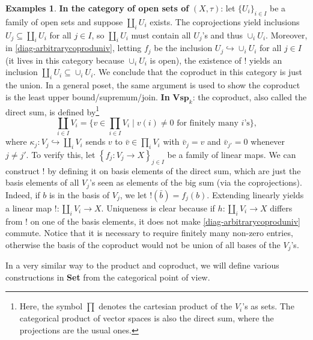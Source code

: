 \documentclass{article}
\theoremstyle{definition}
\newtheorem{exmps}[thm]{Examples}
\theoremstyle{remark}
\begin{document}
\begin{exmps}
    \textbf{In the category of open sets of} $(X, \tau)$: let $\{U_i\}_{i \in I}$ be a family of open sets and suppose $\coprod_i U_i$ exists. The coprojections yield inclusions $U_j \subseteq \coprod_i U_i$ for all $j \in I$, so $\coprod_i U_i$ must contain all $U_j$'s and thus $\cup_i U_i$. Moreover, in \eqref{diag-arbitrarycoproduniv}, letting $f_j$ be the inclusion $U_j \hookrightarrow \cup_iU_i$ for all $j\in I$  (it lives in this category because $\cup_i U_i$ is open), the existence of $!$ yields an inclusion $\coprod_i U_i \subseteq \cup_i U_i$. We conclude that the coproduct in this category is just the union. In a general poset, the same argument is used to show the coproduct is the least upper bound/supremum/join.
    \textbf{In} $\textbf{Vsp}_k$: the coproduct, also called the direct sum, is defined by\footnote{Here, the symbol $\prod$ denotes the cartesian product of the $V_i$'s as sets. The categorical product of vector spaces is also the direct sum, where the projections are the usual ones.} 
        \[\coprod_{i \in I} V_i = \{v \in \prod_{i\in I}V_i \mid v(i) \neq 0 \text{ for finitely many $i$'s}\},\]
        where $\kappa_j: V_j \hookrightarrow \coprod_i V_i$ sends $v$ to $\bar{v} \in \prod_i V_i$ with $\bar{v}_j = v$ and $\bar{v}_{j'} = 0$ whenever $j \neq j'$. To verify this, let $\left\{ f_j: V_j \rightarrow X\right\}_{j \in I}$ be a family of linear maps. We can construct $!$ by defining it on basis elements of the direct sum, which are just the basis elements of all $V_j$'s seen as elements of the big sum (via the coprojections). Indeed, if $b$ is in the basis of $V_j$, we let $!(\bar{b}) = f_j(b)$. Extending linearly yields a linear map $!: \coprod_iV_i \rightarrow X$. Uniqueness is clear because if $h:\coprod_iV_i \rightarrow X$ differs from $!$ on one of the basis elements, it does not make \eqref{diag-arbitrarycoproduniv} commute. Notice that it is necessary to require finitely many non-zero entries, otherwise the basis of the coproduct would not be union of all bases of the $V_j$'s.
\end{exmps}

In a very similar way to the product and coproduct, we will define various constructions in \textbf{Set} from the categorical point of view.
\end{document}
